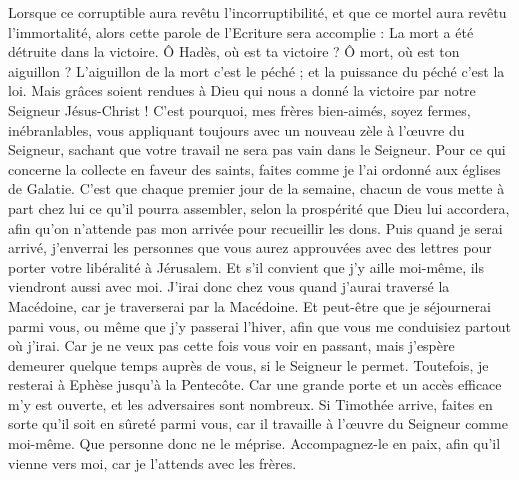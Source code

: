 \begin{multicols}{2}
Lorsque ce corruptible aura revêtu l'incorruptibilité, et que ce mortel aura revêtu l'immortalité, alors cette parole de l'Ecriture sera accomplie : La mort a été détruite dans la victoire.
Ô Hadès, où est ta victoire ? Ô mort, où est ton aiguillon ?
L'aiguillon de la mort c'est le péché ; et la puissance du péché c'est la loi.
Mais grâces soient rendues à Dieu qui nous a donné la victoire par notre Seigneur Jésus-Christ !
C'est pourquoi, mes frères bien-aimés, soyez fermes, inébranlables, vous appliquant toujours avec un nouveau zèle à l’œuvre du Seigneur, sachant que votre travail ne sera pas vain dans le Seigneur.
\VerseOne{}Pour ce qui concerne la collecte en faveur des saints, faites comme je l’ai ordonné aux églises de Galatie.
C’est que chaque premier jour de la semaine, chacun de vous mette à part chez lui ce qu’il pourra assembler, selon la prospérité que Dieu lui accordera, afin qu’on n’attende pas mon arrivée pour recueillir les dons.
Puis quand je serai arrivé, j'enverrai les personnes que vous aurez approuvées avec des lettres pour porter votre libéralité à Jérusalem.
Et s’il convient que j’y aille moi-même, ils viendront aussi avec moi.
J'irai donc chez vous quand j’aurai traversé la Macédoine, car je traverserai par la Macédoine.
Et peut-être que je séjournerai parmi vous, ou même que j'y passerai l'hiver, afin que vous me conduisiez partout où j’irai.
Car je ne veux pas cette fois vous voir en passant, mais j’espère demeurer quelque temps auprès de vous, si le Seigneur le permet.
Toutefois, je resterai à Ephèse jusqu'à la Pentecôte.
Car une grande porte et un accès efficace m'y est ouverte, et les adversaires sont nombreux.
Si Timothée arrive, faites en sorte qu'il soit en sûreté parmi vous, car il travaille à l’œuvre du Seigneur comme moi-même.
Que personne donc ne le méprise. Accompagnez-le en paix, afin qu'il vienne vers moi, car je l'attends avec les frères.

\end{multicols}
